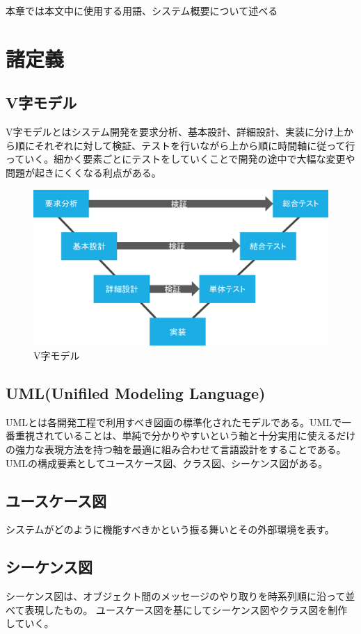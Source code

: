 本章では本文中に使用する用語、システム概要について述べる

\section{諸定義}

\subsection*{V字モデル}
V字モデルとはシステム開発を要求分析、基本設計、詳細設計、実装に分け上から順にそれぞれに対して検証、テストを行いながら上から順に時間軸に従って行っていく。細かく要素ごとにテストをしていくことで開発の途中で大幅な変更や問題が起きにくくなる利点がある。

\begin{figure}[htbp]
\centering
\includegraphics[width=12cm]{./pic/vjimodel.eps}
\caption{V字モデル}
\label{v_model}
\end{figure}

\subsection*{UML(Unifiled Modeling Language)}
UMLとは各開発工程で利用すべき図面の標準化されたモデルである。UMLで一番重視されていることは、単純で分かりやすいという軸と十分実用に使えるだけの強力な表現方法を持つ軸を最適に組み合わせて言語設計をすることである。UMLの構成要素としてユースケース図、クラス図、シーケンス図がある。\cite{uml}

\subsection*{ユースケース図}
システムがどのように機能すべきかという振る舞いとその外部環境を表す。


\subsection*{シーケンス図}
シーケンス図は、オブジェクト間のメッセージのやり取りを時系列順に沿って並べて表現したもの。
ユースケース図を基にしてシーケンス図やクラス図を制作していく。

